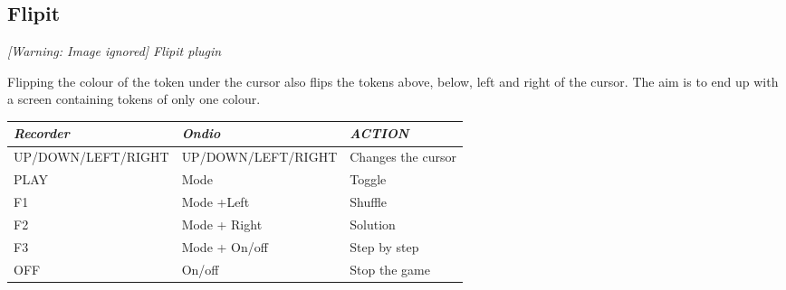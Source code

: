 \subsection{Flipit}
{\centering\itshape
  [Warning: Image ignored] %
 \newline
Flipit plugin
\par}

Flipping the colour of the token under the cursor also flips the tokens
above, below, left and right of the cursor.  The aim is to end up with
a screen containing tokens of only one colour.

\begin{tabular}[c]{|p{4.951cm}|p{4.7050004cm}|p{4.1740003cm}|}
\hline
{\centering\bfseries\itshape
 Recorder
\par}
&
{\centering\bfseries\itshape
Ondio
\par}
&
{\centering\bfseries\itshape
ACTION
\par}
\\\hline
{\centering
UP/DOWN/LEFT/RIGHT
\par}
&
{\centering
UP/DOWN/LEFT/RIGHT
\par}
&
Changes the cursor
\\\hline
{\centering
PLAY
\par}
&
{\centering
Mode
\par}
&
Toggle
\\\hline
{\centering
F1
\par}
&
{\centering
 Mode +Left
\par}
&
Shuffle
\\\hline
{\centering
F2
\par}
&
{\centering
Mode + Right
\par}
&
Solution
\\\hline
{\centering
F3
\par}
&
{\centering
 Mode + On/off
\par}
&
Step by step
\\\hline
{\centering
OFF
\par}
&
{\centering
 On/off
\par}
&
Stop the game
\\\hline
\end{tabular}


